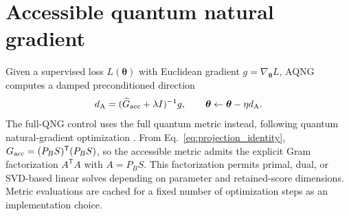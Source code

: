 \section{Accessible quantum natural gradient}

Given a supervised loss $L(\bm\theta)$ with Euclidean gradient $g=\nabla_{\bm\theta}L$, AQNG computes a damped preconditioned direction
\begin{equation}
 d_{\rm A}=(\widehat G_{\rm acc}+\lambda I)^{-1}g,
 \qquad
 \bm\theta\leftarrow\bm\theta-\eta d_{\rm A}.
 \label{eq:aqng_update}
\end{equation}
The full-QNG control uses the full quantum metric instead, following quantum natural-gradient optimization \cite{Stokes2020}. From Eq.~\eqref{eq:projection_identity}, $G_{\rm acc}=(P_BS)^{\mathsf T}(P_BS)$, so the accessible metric admits the explicit Gram factorization $A^{\mathsf T}A$ with $A=P_BS$. This factorization permits primal, dual, or SVD-based linear solves depending on parameter and retained-score dimensions. Metric evaluations are cached for a fixed number of optimization steps as an implementation choice.

